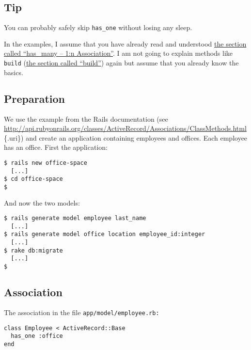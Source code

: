 \documentclass[a4paper]{book}
\begin{document}
\subsection{Tip}\label{tip-8}

You can probably safely skip \texttt{has\_one} without losing any sleep.

In the examples, I assume that you have already read and understood \hyperref[activerecordux5fhasux5fmany]{the section called “has\_many -- 1:n Association”}. I am not going to explain methods like \texttt{build} (\hyperref[activerecordux5fhinzufuegenux5fbuild]{the section called “build”}) again but assume that you already know the basics.

\subsection{Preparation}\label{preparation-1}

We use the example from the Rails documentation (see \url{http://api.rubyonrails.org/classes/ActiveRecord/Associations/ClassMethods.html}\{.uri\}) and create an application containing employees and offices. Each employee has an office. First the application:

\begin{shaded}\begin{verbatim}
$ rails new office-space
  [...]
$ cd office-space
$
\end{verbatim}\end{shaded}

And now the two models:

\begin{shaded}\begin{verbatim}
$ rails generate model employee last_name
  [...]
$ rails generate model office location employee_id:integer
  [...]
$ rake db:migrate
  [...]
$
\end{verbatim}\end{shaded}

\subsection{Association}\label{association}

The association in the file \texttt{app/model/employee.rb:}

\begin{shaded}\begin{verbatim}
class Employee < ActiveRecord::Base
  has_one :office
end
\end{verbatim}\end{shaded}
\end{document}

